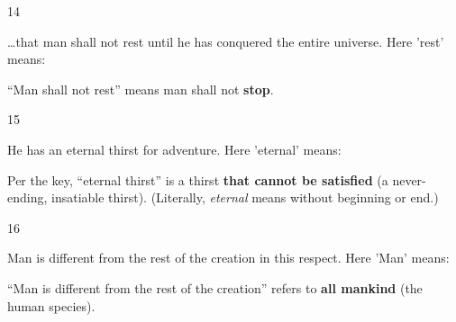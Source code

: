 \begin{question}{14}
{\ldots{}that man shall not rest until he has conquered the entire universe. Here 'rest' means:\par}
\begin{explain}
``Man shall not rest'' means man shall not \textbf{stop}.
\end{explain}
\end{question}

\begin{question}{15}
{He has an eternal thirst for adventure. Here 'eternal' means:\par}
\begin{explain}
Per the key, ``eternal thirst'' is a thirst \textbf{that cannot be satisfied} (a never-ending, insatiable thirst). (Literally, \emph{eternal} means without beginning or end.)
\end{explain}
\end{question}

\begin{question}{16}
{Man is different from the rest of the creation in this respect. Here 'Man' means:\par}
\begin{explain}
``Man is different from the rest of the creation'' refers to \textbf{all mankind} (the human species).
\end{explain}
\end{question}


